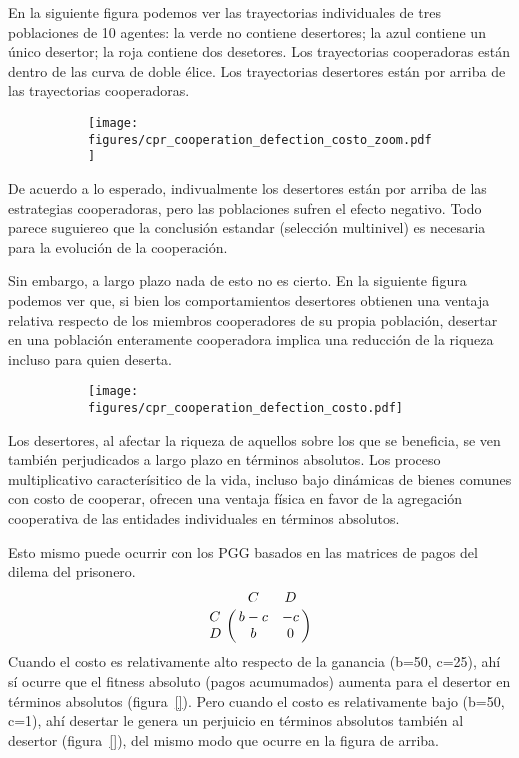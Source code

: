 \documentclass[a4paper,10pt]{article}
\begin{document}

En la siguiente figura podemos ver las trayectorias individuales de tres poblaciones de 10 agentes: la verde no contiene desertores; la azul contiene un único desertor; la roja contiene dos desetores.
Los trayectorias cooperadoras están dentro de las curva de doble élice.
Los trayectorias desertores están por arriba de las trayectorias cooperadoras.

\begin{figure}[H]
    \centering
    \begin{subfigure}[b]{0.45\textwidth}
    \texttt{[image: figures/cpr\_cooperation\_defection\_costo\_zoom.pdf]}
    \end{subfigure}
    \caption{}
    \label{fig:cpr_cooperation_defection_costo_zoom}
\end{figure}

De acuerdo a lo esperado, indivualmente los desertores están por arriba de las estrategias cooperadoras, pero las poblaciones sufren el efecto negativo.
Todo parece suguiereo que la conclusión estandar (selección multinivel) es necesaria para la evolución de la cooperación.


Sin embargo, a largo plazo nada de esto no es cierto.
En la siguiente figura podemos ver que, si bien los comportamientos desertores obtienen una ventaja relativa respecto de los miembros cooperadores de su propia población, desertar en una población enteramente cooperadora implica una reducción de la riqueza incluso para quien deserta.

\begin{figure}[H]
    \centering
    \begin{subfigure}[b]{0.45\textwidth}
    \texttt{[image: figures/cpr\_cooperation\_defection\_costo.pdf]}
    \end{subfigure}
    \caption{}
    \label{fig:cpr_cooperation_zoom}
\end{figure}

Los desertores, al afectar la riqueza de aquellos sobre los que se beneficia, se ven también perjudicados a largo plazo en términos absolutos.
Los proceso multiplicativo caracterísitico de la vida, incluso bajo dinámicas de bienes comunes con costo de cooperar, ofrecen una ventaja física en favor de la agregación cooperativa de las entidades individuales en términos absolutos.


Esto mismo puede ocurrir con los PGG basados en las matrices de pagos del dilema del prisonero.
\begin{equation}
    \bordermatrix{ & C & D \cr
      C & b-c & -c \cr
      D & b & 0  } 
\end{equation}
Cuando el costo es relativamente alto respecto de la ganancia (b=50, c=25), ahí sí ocurre que el fitness absoluto (pagos acumumados) aumenta para el desertor en términos absolutos (figura~\ref{}).
Pero cuando el costo es relativamente bajo (b=50, c=1), ahí desertar le genera un perjuicio en términos absolutos también al desertor (figura~\ref{}), del mismo modo que ocurre en la figura de arriba.
\end{document}
